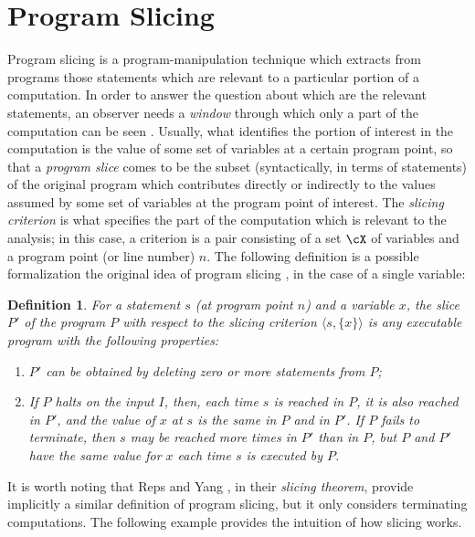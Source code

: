 \documentclass[prodmode,acmtocl]{acmsmall}
\def\tuple#1{\langle #1 \rangle}
\newcommand{\0}{\mbox{\bf 0}}
\newtheorem{mydefinition}[theorem]{Definition}
\begin{document}
\section{Program Slicing}
Program slicing \cite{weiser} is a program-manipulation technique
which extracts from programs those statements which are relevant to a
particular portion of a computation.  In order to answer the question
about which are the relevant statements, an observer needs
a \emph{window} through which only a part of the computation can be
seen \cite{BinGalla96}.  Usually, what identifies the portion of
interest in the computation is the value of some set of variables at a
certain program point, so that a \emph{program slice} comes to be the
subset (syntactically, in terms of statements) of the original program
which contributes directly or indirectly to the values assumed by some
set of variables at the program point of interest.  The \emph{slicing
criterion} is what specifies the part of the computation which is
relevant to the analysis; in this case, a criterion is a pair
consisting of a set $\cX$ of variables and a program point (or line
number) $n$.  The following definition \cite{BinGalla96} is a possible
formalization the original idea of program slicing \cite{weiser}, in
the case of a single variable:
\begin{mydefinition}\cite{BinGalla96}
  \label{defSlice}
  For a statement $s$ (at program point $n$) and a variable $x$, the
  slice $P'$ of the program $P$ with respect to the slicing criterion
  $\tuple{s,\{x\}}$ is any executable program with the following
  properties:
  \begin{enumerate}
  \item $P'$ can be obtained by deleting zero or more statements from
    $P$;
  \item If $P$ halts on the input $I$, then, each time $s$ is reached
    in $P$, it is also reached in $P'$, and the value of $x$ at $s$ is
    the same in $P$ and in $P'$.  If $P$ fails to terminate, then $s$
    may be reached more times in $P'$ than in $P$, but $P$ and $P'$
    have the same value for $x$ each time $s$ is executed by $P$.
  \end{enumerate}
\end{mydefinition}

It is worth noting that Reps and Yang \cite{RY88}, in
their \emph{slicing theorem}, provide implicitly a similar definition
of program slicing, but it only considers terminating
computations. The following example provides the intuition of how
slicing works.
\end{document}
